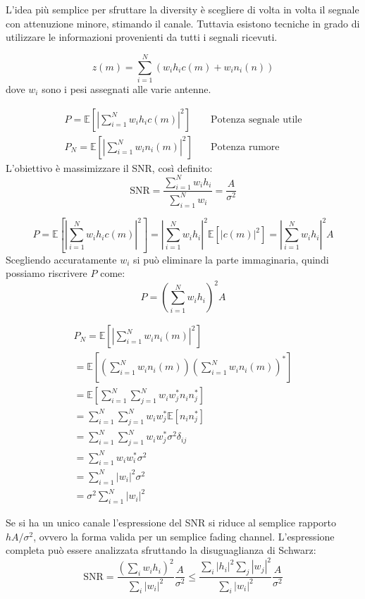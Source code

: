 L'idea più semplice per sfruttare la diversity è scegliere di volta in volta il segnale con attenuzione minore, stimando il canale. Tuttavia esistono tecniche in grado di utilizzare le informazioni provenienti da tutti i segnali ricevuti.

\[
    z(m) = \sum_{i=1}^{N} \left( w_i h_i c(m) + w_i n_i(n) \right)
\]
dove $w_i$ sono i pesi assegnati alle varie antenne.


\[
    \begin{array}{ll} 
        P = \mathbb{E} \left[ \left| \sum_{i=1}^{N} w_i h_i c(m)  \right|^2 \right] \quad & \text{Potenza segnale utile} \\
        P_N = \mathbb{E} \left[ \left| \sum_{i=1}^{N} w_i n_i(m)  \right|^2 \right] \quad & \text{Potenza rumore}
    \end{array}
\]
L'obiettivo è massimizzare il SNR, così definito:
\[
    \text{SNR} = \frac{\sum_{i=1}^{N} w_i h_i}{\sum_{i=1}^{N} w_i} = \frac{A}{\sigma^2}  
\]

\[
    P = \mathbb{E} \left[ \left|  \sum_{i=1}^{N} w_i h_i c(m)  \right| ^2  \right] = \left| \sum_{i=1}^{N} w_i h_i \right|^2 \mathbb{E} \left[ \left| c(m)\right|^2  \right] = \left| \sum_{i=1}^{N} w_i h_i \right|^2 A
\]
Scegliendo accuratamente $w_i$ si può eliminare la parte immaginaria, quindi possiamo riscrivere $P$ come:
\[
    P = \left( \sum_{i=1}^{N} w_i h_i \right)^2 A
\]



\[
    \begin{array}{ll}
            P_N = \mathbb{E} \left[ \left| \sum_{i=1}^{N} w_i n_i(m)  \right|^2 \right] \\
            = \mathbb{E} \left[ \left( \sum_{i=1}^{N} w_i n_i(m) \right)  \left( \sum_{i=1}^{N} w_i n_i(m) \right)^*  \right] \\
            = \mathbb{E} \left[  \sum_{i=1}^{N} \sum_{j=1}^{N} w_i w_j^* n_i n_j^*  \right] \\
            = \sum_{i=1}^{N} \sum_{j=1}^{N} w_i w_j^* \mathbb{E} \left[ n_i n_j^* \right] \\
            = \sum_{i=1}^{N} \sum_{j=1}^{N} w_i w_j^* \sigma^2 \delta_{ij} \\
            = \sum_{i=1}^{N} w_i w_i^* \sigma^2 \\
            = \sum_{i=1}^{N} |w_i|^2 \sigma^2 \\
            = \sigma^2 \sum_{i=1}^{N} |w_i|^2 
    \end{array}
\]

Se si ha un unico canale l'espressione del SNR si riduce al semplice rapporto $hA/\sigma^2$, ovvero la forma valida per un semplice fading channel.
L'espressione completa può essere analizzata sfruttando la disuguaglianza di Schwarz:
\[
    \text{SNR} = \frac{\left(\sum_{i} w_i h_i \right)^2}{\sum_{i} |w_i|^2} \frac{A}{\sigma ^2} \leq \frac{\sum_{i} |h_i|^2 \sum_{j} \left| w_j \right|^2}{\sum_{i} |w_i|^2} \frac{A}{\sigma^2}
\]



